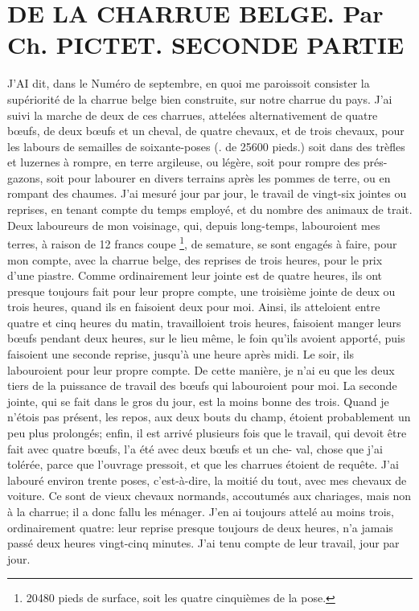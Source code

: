 \setcounter{page}{394}
\section{DE LA CHARRUE BELGE. Par Ch. PICTET. SECONDE PARTIE}
J'AI dit, dans le Numéro de septembre, en quoi me paroissoit consister la supériorité de la charrue belge bien construite, sur notre charrue du pays. J'ai suivi la marche de deux de ces charrues, attelées alternativement de quatre bœufs, de deux bœufs et un cheval, de quatre chevaux, et de trois chevaux, pour les labours de semailles de soixante-poses (. de 25600 pieds.) soit dans des trèfles et luzernes à rompre, en terre argileuse, ou légère, soit pour rompre des prés-gazons, soit pour labourer en divers terrains après les pommes de terre, ou en rompant des chaumes. J'ai mesuré jour par jour, le travail de vingt-six jointes ou reprises, en tenant compte du temps employé, et du nombre des animaux de trait. Deux laboureurs de mon voisinage, qui, depuis long-temps, labouroient mes terres, à raison de 12 francs\setcounter{page}{395} coupe \footnote{20480 pieds de surface, soit les quatre cinquièmes de la pose.}, de semature, se sont engagés à faire, pour mon compte, avec la charrue belge, des reprises de trois heures, pour le prix d'une piastre. Comme ordinairement leur jointe est de quatre heures, ils ont presque toujours fait pour leur propre compte, une troisième jointe de deux ou trois heures, quand ils en faisoient deux pour moi. Ainsi, ils atteloient entre quatre et cinq heures du matin, travailloient trois heures, faisoient manger leurs bœufs pendant deux heures, sur le lieu même, le foin qu'ils avoient apporté, puis faisoient une seconde reprise, jusqu'à une heure après midi. Le soir, ils labouroient pour leur propre compte. De cette manière, je n'ai eu que les deux tiers de la puissance de travail des bœufs qui labouroient pour moi. La seconde jointe, qui se fait dans le gros du jour, est la moins bonne des trois. Quand je n'étois pas présent, les repos, aux deux bouts du champ, étoient probablement un peu plus prolongés; enfin, il est arrivé plusieurs fois que le travail, qui devoit être fait avec quatre bœufs, l'a été avec deux bœufs et un che-\setcounter{page}{396} val, chose que j'ai tolérée, parce que l'ouvrage pressoit, et que les charrues étoient de requête.
J'ai labouré environ trente poses, c'est-à-dire, la moitié du tout, avec mes chevaux de voiture. Ce sont de vieux chevaux normands, accoutumés aux chariages, mais non à la charrue; il a donc fallu les ménager. J'en ai toujours attelé au moins trois, ordinairement quatre: leur reprise presque toujours de deux heures, n'a jamais passé deux heures vingt-cinq minutes. J'ai tenu compte de leur travail, jour par jour.
